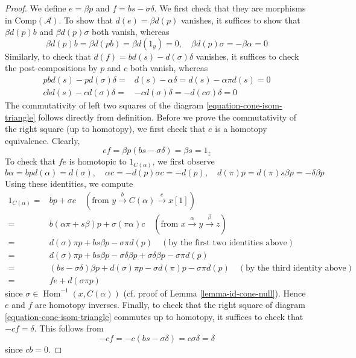 \documentclass{stacks-project}
\theoremstyle{plain}
\theoremstyle{definition}
\theoremstyle{remark}
\numberwithin{equation}{subsection}
\def\Hom{\mathop{\mathrm{Hom}}\nolimits}
\begin{document}
\begin{proof}
\medskip\noindent
We define $e=\beta p$ and $f=bs-\sigma\delta$. We first check that they are
morphisms in $\text{Comp}(\mathcal{A})$. To show that $d(e)=\beta d(p)$
vanishes, it suffices to show that $\beta d(p)b$ and $\beta d(p)\sigma$
both vanish, whereas
$$
\beta d(p)b = \beta d(pb) = \beta d(1_y) = 0,\quad
\beta d(p)\sigma = -\beta\alpha = 0
$$
Similarly, to check that $d(f)=bd(s)-d(\sigma)\delta$ vanishes,
it suffices to check the post-compositions by $p$ and $c$ both vanish,
whereas
\begin{align*}
pbd(s) - pd(\sigma)\delta
= &
d(s)-\alpha\delta = d(s)-\alpha\pi d(s) = 0 \\
cbd(s)-cd(\sigma)\delta
= &
-cd(\sigma)\delta = -d(c\sigma)\delta = 0
\end{align*}
The commutativity of left two squares of the
diagram \ref{equation-cone-isom-triangle} follows directly from definition.
Before we prove the commutativity of the right square (up to homotopy),
we first check that $e$ is a homotopy equivalence. Clearly,
$$
ef=\beta p (bs-\sigma\delta)=\beta s=1_z
$$
To check that $fe$ is homotopic to $1_{C(\alpha)}$, we first observe
$$
b\alpha = bpd(\alpha) = d(\sigma),\quad
\alpha c = -d(p)\sigma c = -d(p),\quad
d(\pi)p = d(\pi)s\beta p = -\delta\beta p
$$
Using these identities, we compute
\begin{align*}
1_{C(\alpha)} = &
bp + \sigma c
\quad (\text{from }y \xrightarrow{b} C(\alpha) \xrightarrow{c} x[1]) \\
= &
b(\alpha\pi + s\beta)p + \sigma(\pi\alpha)c
\quad (\text{from }x \xrightarrow{\alpha} y \xrightarrow{\beta} z) \\
= &
d(\sigma)\pi p + bs\beta p - \sigma\pi d(p)
\quad (\text{by the first two identities above}) \\
= &
d(\sigma)\pi p + bs\beta p - \sigma\delta\beta p
+ \sigma\delta\beta p - \sigma\pi d(p) \\
= &
(bs - \sigma\delta)\beta p + d(\sigma)\pi p
- \sigma d(\pi)p - \sigma\pi d(p)\quad
(\text{by the third identity above}) \\
= &
fe + d(\sigma \pi p)
\end{align*}
since $\sigma \in \Hom^{-1}(x, C(\alpha))$
(cf. proof of Lemma \ref{lemma-id-cone-null}).
Hence $e$ and $f$ are homotopy inverses.
Finally, to check that the right square of
diagram \ref{equation-cone-isom-triangle} commutes up to homotopy,
it suffices to check that $-cf=\delta$. This follows from
$$
-cf = -c(bs-\sigma\delta) = c\sigma\delta = \delta
$$
since $cb=0$.


\end{proof}
\end{document}
